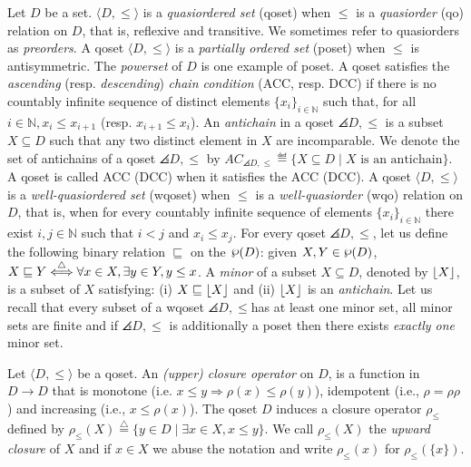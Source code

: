 Let $D$ be a set.
$\langle D, \leq \rangle$ is a \emph{quasiordered set} (qoset) when $\leq$
is a \emph{quasiorder} (qo) relation on $D$, that is, reflexive and transitive.
We sometimes refer to quasiorders as \emph{preorders}.
A qoset $\langle D, \leq \rangle$ is a \emph{partially ordered set} (poset)
when $\leq$ is antisymmetric.
The \emph{powerset} of $D$ is one example of poset.
A qoset satisfies the \emph{ascending} (resp. \emph{descending}) \emph{chain condition}
(ACC, resp. DCC) if there is no countably infinite sequence of distinct elements
$\{x_i\}_{i \in \mathbb{N}}$ such that, for all $i \in \mathbb{N}, x_i \leq x_{i+1}$
(resp. $x_{i+1} \leq x_i$).
An \emph{antichain} in a qoset $\angles{D,\leq}$ is a subset $X \subseteq D$ such that
any two distinct element  in $X$ are incomparable.
We denote the set of antichains of a qoset $\angles{D, \leq}$ by
$AC_{\angles{D,\leq}} \eqdef \{X \subseteq D \;|\; X \textrm{ is an antichain}\}$.
A qoset is called ACC (DCC) when it satisfies the ACC (DCC).
A qoset $\langle D, \leq \rangle$ is a \emph{well-quasiordered set} (wqoset)
when $\leq$ is a \emph{well-quasiorder} (wqo) relation  on $D$, that is,
when for every countably infinite sequence of elements $\{x_i\}_{i \in \mathbb{N}}$
there exist $i,j \in \mathbb{N}$ such that $i < j$ and $x_i \leq x_j$.
For every qoset $\angles{D,\leq}$, let us define the following binary relation
$\sqsubseteq$ on the $\powerset (D)$: given $X,Y \in \powerset(D)$,
$X \sqsubseteq Y \overset{\triangle}{\Longleftrightarrow} \forall x \in X, \exists y \in Y, y \leq x$.
A \emph{minor} of a subset $X \subseteq D$, denoted by $\lfloor X \rfloor$, is a subset
of $X$ satisfying: (i) $X \sqsubseteq \lfloor X \rfloor$ and (ii) $\lfloor X \rfloor$ is an \emph{antichain}.
Let us recall that every subset of a wqoset $\angles{D,\leq}$has at least one minor set,
all minor sets are finite and if $\angles{D,\leq}$ is additionally a poset then
there exists \emph{exactly one} minor set.

Let $\langle D, \leq \rangle$ be a qoset.
An \emph{(upper) closure operator} on $D$, is a function in $D \rightarrow D$
that is monotone (i.e. $x \leq y \Longrightarrow \rho (x) \leq \rho(y)$),
idempotent (i.e., $\rho = \rho \rho$) and increasing
(i.e., $x \leq \rho(x)$).
The qoset $D$ induces a closure operator $\rho_{\leq}$ defined by
$\rho_{\leq}(X) \overset{\triangle}{=} \{ y \in D \;|\; \exists x \in X, x \leq y\}$.
We call $\rho_{\leq}(X)$ the \emph{upward closure} of $X$ and if $x \in X$
we abuse the notation and write $\rho_{\leq}(x)$ for $\rho_{\leq}(\{x\})$.

